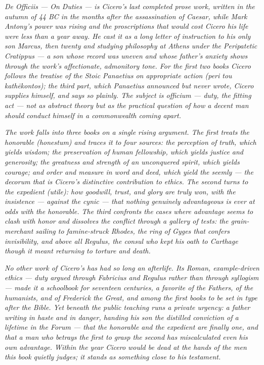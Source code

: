 
\textit{\textit{De Officiis} --- On Duties --- is Cicero's last completed
prose work, written in the autumn of 44 BC in the months after the
assassination of Caesar, while Mark Antony's power was rising and the
proscriptions that would cost Cicero his life were less than a year
away. He cast it as a long letter of instruction to his only son
Marcus, then twenty and studying philosophy at Athens under the
Peripatetic Cratippus --- a son whose record was uneven and whose
father's anxiety shows through the work's affectionate, admonitory
tone. For the first two books Cicero follows the treatise of the Stoic
Panaetius on appropriate action (\textit{peri tou kathēkontos}); the
third part, which Panaetius announced but never wrote, Cicero supplies
himself, and says so plainly. The subject is \textit{officium} ---
duty, the fitting act --- not as abstract theory but as the practical
question of how a decent man should conduct himself in a commonwealth
coming apart.}

\textit{The work falls into three books on a single rising argument.
The first treats the honorable (\textit{honestum}) and traces it to
four sources: the perception of truth, which yields wisdom; the
preservation of human fellowship, which yields justice and generosity;
the greatness and strength of an unconquered spirit, which yields
courage; and order and measure in word and deed, which yield the
seemly --- the \textit{decorum} that is Cicero's distinctive
contribution to ethics. The second turns to the expedient
(\textit{utile}): how goodwill, trust, and glory are truly won, with
the insistence --- against the cynic --- that nothing genuinely
advantageous is ever at odds with the honorable. The third confronts
the cases where advantage seems to clash with honor and dissolves the
conflict through a gallery of tests: the grain-merchant sailing to
famine-struck Rhodes, the ring of Gyges that confers invisibility, and
above all Regulus, the consul who kept his oath to Carthage though it
meant returning to torture and death.}

\textit{No other work of Cicero's has had so long an afterlife. Its
Roman, example-driven ethics --- duty argued through Fabricius and
Regulus rather than through syllogism --- made it a schoolbook for
seventeen centuries, a favorite of the Fathers, of the humanists, and
of Frederick the Great, and among the first books to be set in type
after the Bible. Yet beneath the public teaching runs a private
urgency: a father writing in haste and in danger, handing his son the
distilled conviction of a lifetime in the Forum --- that the honorable
and the expedient are finally one, and that a man who betrays the first
to grasp the second has miscalculated even his own advantage. Within
the year Cicero would be dead at the hands of the men this book quietly
judges; it stands as something close to his testament.}
